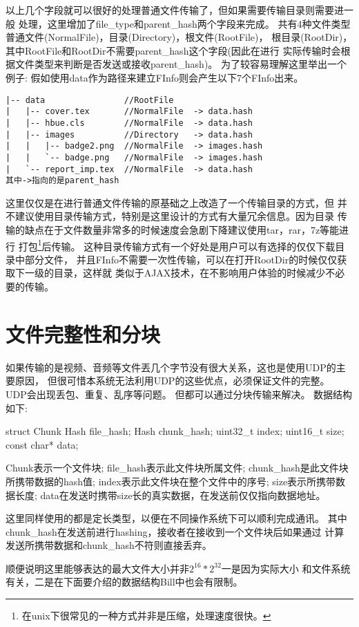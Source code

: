 以上几个字段就可以很好的处理普通文件传输了，但如果需要传输目录则需要进一般
处理，这里增加了file\_type和parent\_hash两个字段来完成。
共有4种文件类型普通文件(NormalFile)，目录(Directory)，根文件(RootFile)，
根目录(RootDir)，其中RootFile和RootDir不需要parent\_hash这个字段(因此在进行
实际传输时会根据文件类型来判断是否发送或接收parent\_hash)。
为了较容易理解这里举出一个例子:
假如使用data作为路径来建立FInfo则会产生以下7个FInfo出来。
\newpage
\begin{verbatim}
|-- data  				//RootFile
|   |-- cover.tex   	//NormalFile  -> data.hash
|   |-- hbue.cls		//NormalFile  -> data.hash
|   |-- images			//Directory   -> data.hash
|   |   |-- badge2.png 	//NormalFile  -> images.hash
|   |   `-- badge.png 	//NormalFile  -> images.hash
|   `-- report_imp.tex	//NormalFile  -> data.hash	
其中->指向的是parent_hash
\end{verbatim}
这里仅仅是在进行普通文件传输的原基础之上改造了一个传输目录的方式，但
并不建议使用目录传输方式，特别是这里设计的方式有大量冗余信息。因为目录
传输的缺点在于文件数量非常多的时候速度会急剧下降建议使用tar，rar，7z等能进行
打包\footnote{在unix下很常见的一种方式并非是压缩，处理速度很快。}后传输。
这种目录传输方式有一个好处是用户可以有选择的仅仅下载目录中部分文件，
并且FInfo不需要一次性传输，可以在打开RootDir的时候仅仅获取下一级的目录，这样就
类似于AJAX技术，在不影响用户体验的时候减少不必要的传输。


\section{文件完整性和分块}
如果传输的是视频、音频等文件丟几个字节没有很大关系，这也是使用UDP的主要原因，
但很可惜本系统无法利用UDP的这些优点，必须保证文件的完整。
UDP会出现丢包、重复、乱序等问题。
但都可以通过分块传输来解决。
数据结构如下:
\begin{cppcode}
struct Chunk {
	Hash file_hash;
	Hash chunk_hash;
	uint32_t index;
	uint16_t size;
	const char* data;
}
\end{cppcode}
Chunk表示一个文件块;
file\_hash表示此文件块所属文件;
chunk\_hash是此文件块所携带数据的hash值;
index表示此文件块在整个文件中的序号;
size表示所携带数据长度;
data在发送时携带size长的真实数据，在发送前仅仅指向数据地址。

这里同样使用的都是定长类型，以便在不同操作系统下可以顺利完成通讯。
其中chunk\_hash在发送前进行hashing，接收者在接收到一个文件块后如果通过
计算发送所携带数据和chunk\_hash不符则直接丢弃。

顺便说明这里能够表达的最大文件大小并非$2^{16}*2^{32}$一是因为实际大小
和文件系统有关，二是在下面要介绍的数据结构Bill中也会有限制。

